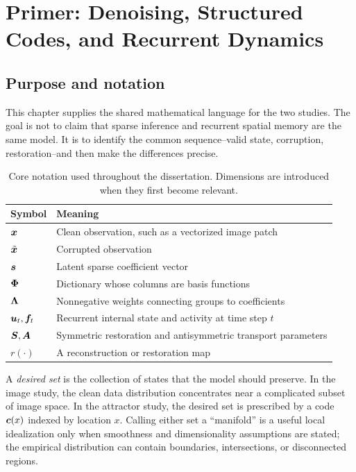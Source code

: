 \chapter{Primer: Denoising, Structured Codes, and Recurrent Dynamics}
\label{chap:framework}

\section{Purpose and notation}
\label{sec:framework-purpose}

This chapter supplies the shared mathematical language for the two studies. The goal is not to claim that sparse inference and recurrent spatial memory are the same model. It is to identify the common sequence--valid state, corruption, restoration--and then make the differences precise.

\begin{table}[ht]
\centering
\caption{Core notation used throughout the dissertation. Dimensions are introduced when they first become relevant.}
\label{tab:notation-core}
\begin{tabularx}{\textwidth}{@{}lX@{}}
\toprule
Symbol & Meaning \\
\midrule
$\bm{x}$ & Clean observation, such as a vectorized image patch \\
$\tilde{\bm{x}}$ & Corrupted observation \\
$\bm{s}$ & Latent sparse coefficient vector \\
$\bm{\Phi}$ & Dictionary whose columns are basis functions \\
$\bm{\Lambda}$ & Nonnegative weights connecting groups to coefficients \\
$\bm{u}_t,\bm{f}_t$ & Recurrent internal state and activity at time step $t$ \\
$\bm{S},\bm{A}$ & Symmetric restoration and antisymmetric transport parameters \\
$r(\cdot)$ & A reconstruction or restoration map \\
\bottomrule
\end{tabularx}
\end{table}

A \emph{desired set} is the collection of states that the model should preserve. In the image study, the clean data distribution concentrates near a complicated subset of image space. In the attractor study, the desired set is prescribed by a code $\bm{c}(x)$ indexed by location $x$. Calling either set a ``manifold'' is a useful local idealization only when smoothness and dimensionality assumptions are stated; the empirical distribution can contain boundaries, intersections, or disconnected regions.

